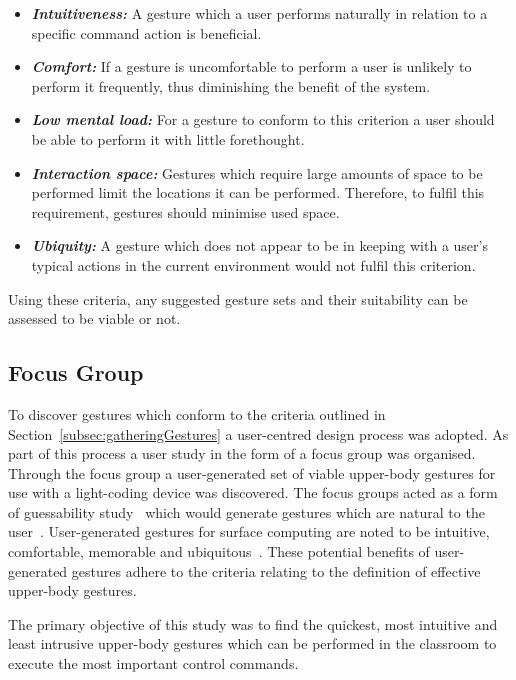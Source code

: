 \documentclass[link]{IWCOMP}
\begin{document}
\begin{itemize}
\item \textit{\textbf{Intuitiveness:}} A gesture which a user performs naturally in relation to a specific command action is beneficial.
\item \textit{\textbf{Comfort:}} If a gesture is uncomfortable to perform a user is unlikely to perform it frequently, thus diminishing the benefit of the system.
\item \textit{\textbf{Low mental load:}} For a gesture to conform to this criterion a user should be able to perform it with little forethought.
\item \textit{\textbf{Interaction space:}} Gestures which require large amounts of space to be performed limit the locations it can be performed.
Therefore, to fulfil this requirement, gestures should minimise used space.
\item \textit{\textbf{Ubiquity:}} A gesture which does not appear to be in keeping with a user's typical actions in the current environment would not fulfil this criterion. \\ 
\end{itemize}

Using these criteria, any suggested gesture sets and their suitability can be assessed to be viable or not.

\subsection{Focus Group} 
\label{subsec:focusGroupDesign}

To discover gestures which conform to the criteria outlined in Section~\ref{subsec:gatheringGestures} a user-centred design process was adopted.
As part of this process a user study in the form of a focus group was organised.
Through the focus group a user-generated set of viable upper-body gestures for use with a light-coding device was discovered.
The focus groups acted as a form of guessability study~\cite{Ruiz2011,Wobbrock2009} which would generate gestures which are natural to the user~\cite{Grandhi2011}.
User-generated gestures for surface computing are noted to be intuitive, comfortable, memorable and ubiquitous~\cite{Bjorneseth2012}.
These potential benefits of user-generated gestures adhere to the criteria relating to the definition of effective upper-body gestures.

The primary objective of this study was to find the quickest, most intuitive and least intrusive upper-body gestures which can be performed in the classroom to execute the most important control commands.
\end{document}
